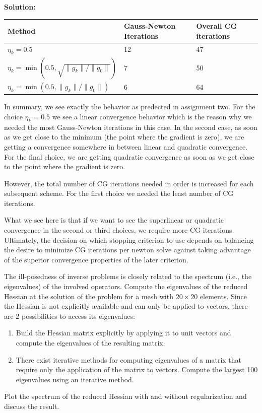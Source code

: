\documentclass[11pt]{article}
\newenvironment{solution}{\begin{trivlist}\item[]{\bf Solution:}}
                      {\end{trivlist}}
\begin{document}
\begin{enumerate}
\begin{solution}
\begin{center}
 \begin{tabular}{l||l|l}
  Method & Gauss-Newton Iterations & Overall CG iterations\\
  \hline\hline
  $\eta_k=0.5$ & 12 & 47\\
  $\eta_k=\min(0.5,\sqrt{\|g_k\|/\|g_0\|})$ & 7 & 50\\
  $\eta_k=\min(0.5,\|g_k\|/\|g_0\|)$ & 6 & 64
 \end{tabular}
\end{center}

In summary, we see exactly the behavior as predected in assignment
 two. For the choice $\eta_k=0.5$ we see a linear convergence behavior
 which is the  reason why we needed the most Gauss-Newton iterations in
 this case. In  the second case, as soon as we get close to the minimum
 (the point  where the gradient is zero), we are getting a convergence somewhere
 in between  linear and quadratic convergence. 
 For the final choice, we are getting quadratic convergence as soon as we get close to
 the point where the gradient is zero. 

 However, the total number of CG iterations needed in
 order is increased for each subsequent scheme. 
 For the first choice we needed the least number of CG iterations. 

 What we see here is that if we want to see the superlinear or quadratic
 convergence in the second or third choices, we require more CG
 iterations. Ultimately, the decision on which stopping criterion to use depends on
 balancing the desire to minimize CG iterations per newton solve against
 taking advantage of the superior convergence properties of the later
 criterion. 

\end{solution}

\item[(d)]The ill-posedness of inverse problems is closely related to
	  the spectrum (i.e., the eigenvalues) of the involved
	  operators. Compute the eigenvalues of the reduced Hessian at
	  the solution of the problem for a mesh with $20 \times 20$
	  elements. Since the Hessian is not explicitly available and
	  can only be applied to vectors, there are 2 possibilities to
	  access its eigenvalues: 
\begin{enumerate}
\item[$\bullet$] Build the Hessian matrix explicitly by applying it to
	     unit vectors and compute the eigenvalues of the resulting
	     matrix. 
\item[$\bullet$] There exist iterative methods for computing
	     eigenvalues of a matrix that require only the application
	     of the matrix to vectors. Compute the largest
	     100 eigenvalues using an iterative method. 
\end{enumerate}
Plot the spectrum of the reduced Hessian with and without regularization 
	  and discuss the result. 


\end{enumerate}
\end{document}
